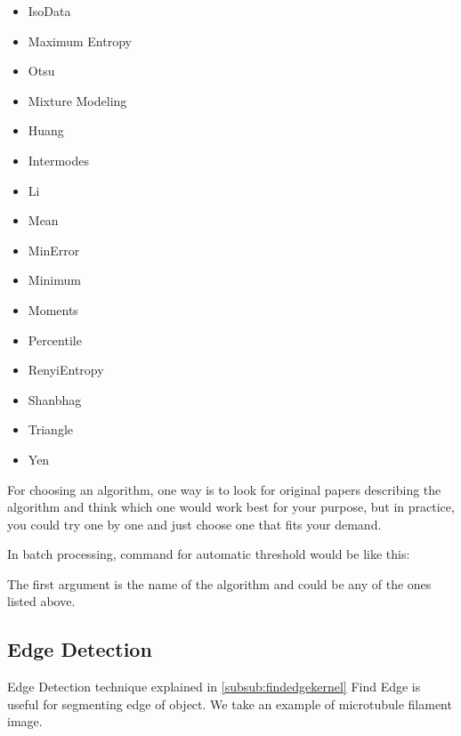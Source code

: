 \begin{itemize}
\item IsoData
\item Maximum Entropy
\item Otsu
\item Mixture Modeling
\item Huang
\item Intermodes
\item Li
\item Mean
\item MinError
\item Minimum
\item Moments
\item Percentile
\item RenyiEntropy
\item Shanbhag
\item Triangle
\item Yen
\end{itemize}

For choosing an algorithm, one way is to look for original papers
describing the algorithm and think which one would work best for your
purpose, but in practice, you could try one by one and just choose one
that fits your demand. 

In batch processing, command for automatic threshold would be like this:


The first argument is the name of the algorithm and could be any of the
ones listed above.
 
\subsection{Edge Detection}

Edge Detection technique explained in \ref{subsub:findedgekernel} Find Edge is useful for
segmenting edge of object. We take an example of microtubule filament image. 

